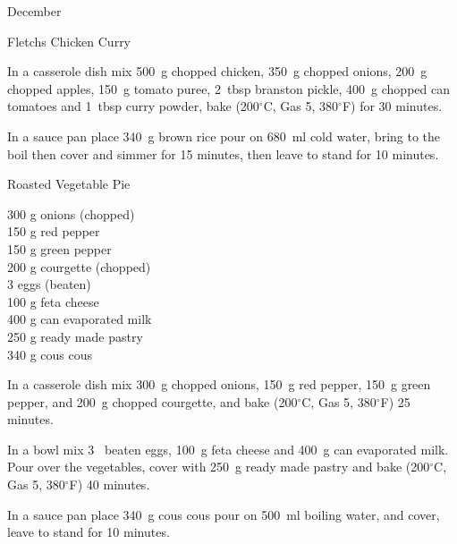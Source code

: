 \begin{menu}{December}
\begin{recipe}{2}{Fletchs Chicken Curry}
\begin{ingredients}
		\end{ingredients}
	
	
	
    \begin{instructions}
    \item 
        In a casserole dish mix
        500~g chopped chicken,
        350~g chopped onions,
        200~g chopped apples,
        150~g  tomato puree,
        2~tbsp  branston pickle,
        400~g chopped can tomatoes
        and
        1~tbsp  curry powder,
        bake (200$^{\circ}$C, Gas 5, 380$^{\circ}$F) for 30 minutes.
      \item 
    In a
    sauce pan
    place
    340~g  brown rice
    pour on
    680~ml  cold water,
    bring to the boil then cover and simmer for 15 minutes,
    then leave to stand for 10 minutes.
  
    \end{instructions}
    \end{recipe}%
  
    \begin{recipe}{2}{Roasted Vegetable Pie}%
		\begin{ingredients}
		300 g onions (chopped) \\
	150 g red pepper  \\
	150 g green pepper  \\
	200 g courgette (chopped) \\
	3  eggs (beaten) \\
	100 g feta cheese  \\
	400 g can evaporated milk  \\
	250 g ready made pastry  \\
	340 g cous cous  \\
	
		\end{ingredients}
	
	
    \begin{instructions}
    \item 
        In a casserole dish mix
        300~g chopped onions,
        150~g  red pepper,
        150~g  green pepper,
        and
        200~g chopped courgette,
        and bake (200$^{\circ}$C, Gas 5, 380$^{\circ}$F) 25 minutes.
      \item 
        In a bowl mix
        3~ beaten eggs,
        100~g  feta cheese
        and
        400~g  can evaporated milk.
        Pour over the vegetables,
        cover with
        250~g  ready made pastry
        and bake (200$^{\circ}$C, Gas 5, 380$^{\circ}$F) 40 minutes.
      \item 
    In a
    sauce pan 
    place
    340~g  cous cous
    pour on
    500~ml  boiling water,
    and cover, leave to stand for 10 minutes.
  

\end{instructions}
\end{recipe}
\end{menu}
